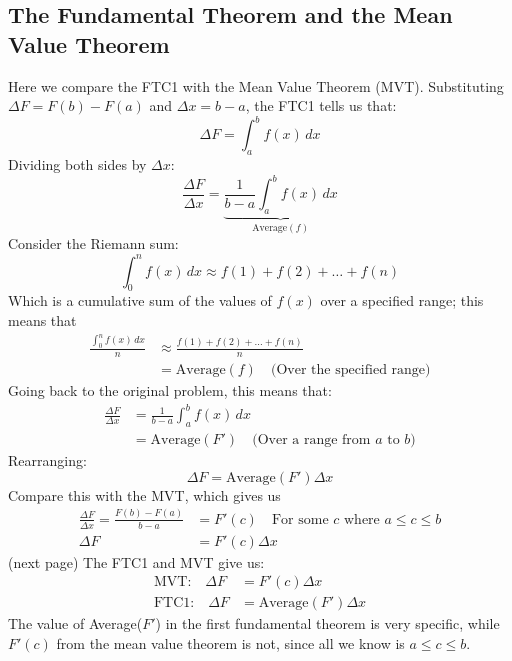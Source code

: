 \documentclass{report}
\begin{document}
\subsection{The Fundamental Theorem and the Mean Value Theorem} %
Here we compare the FTC1 with the Mean Value Theorem (MVT).
Substituting $\Delta F=F(b)-F(a)$ and $\Delta x=b-a$, the FTC1 tells us that:
\begin{equation*}
\Delta F=\int_a^bf(x)\,dx
\end{equation*}
Dividing both sides by $\Delta x$:
\begin{equation*}
\frac{\Delta F}{\Delta x}
=\underbrace{\frac{1}{b-a}\int_a^bf(x)\,dx}_{\text{Average$(f)$}}
\end{equation*}
Consider the Riemann sum:
\begin{equation*}
\int_0^nf(x)\,dx\approx f(1)+f(2)+\ldots+f(n)
\end{equation*}
Which is a cumulative sum of the values of $f(x)$ over a specified range;
this means that
\begin{align*} 
\frac{\int_0^nf(x)\,dx}{n}&\approx
\frac{f(1)+f(2)+\ldots+f(n)}{n}\\
&=\text{Average}(f)
\quad\text{(Over the specified range)}
\end{align*}
Going back to the original problem, this means that:
\begin{align*}
\frac{\Delta F}{\Delta x}
&=\frac{1}{b-a}\int_a^bf(x)\,dx\\
&=\text{Average}(F')
\quad\text{(Over a range from $a$ to $b$)}
\end{align*}
Rearranging:
\begin{equation*}
\Delta F=\text{Average}(F')\Delta x
\end{equation*}
Compare this with the MVT, which gives us
\begin{align*}
\frac{\Delta F}{\Delta x}=\frac{F(b)-F(a)}{b-a}
&=F'(c)\quad\text{For some $c$ where $a\leq c\leq b$}\\
\Delta F&=F'(c)\Delta x
\end{align*}
(next page)
\newpage
\noindent The FTC1 and MVT give us:
\begin{align*}
\text{MVT:}\quad\Delta F&=F'(c)\Delta x\\
\text{FTC1:}\quad\Delta F&=\text{Average}(F')\Delta x
\end{align*}
The value of Average($F'$) in the first fundamental theorem is very specific, 
while $F'(c)$ from the mean value theorem is not, since all we know is $a\leq c\leq b$.\\
\end{document}
